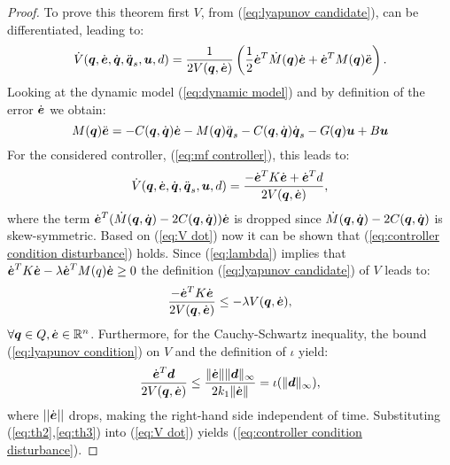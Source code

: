 \begin{proof}
    To prove this theorem first $V$, from (\ref{eq:lyapunov candidate}), can be differentiated, leading to:
    \begin{equation}
        \dot{V}({\boldsymbol{q}},\dot{\boldsymbol{e}},\dot{{\boldsymbol{q}}},\ddot{{\boldsymbol{q}}}_s,\boldsymbol{u},d) = \frac{1}{2 V({\boldsymbol{q}},\dot{\boldsymbol{e}})} \left( \frac{1}{2}\dot{\boldsymbol{e}}^T \dot{M}({\boldsymbol{q}}) \dot{\boldsymbol{e}}+\dot{\boldsymbol{e}}^T M({\boldsymbol{q}}) \ddot{\boldsymbol{e}} \right).
    \end{equation}
    Looking at the dynamic model (\ref{eq:dynamic model}) and by definition of the error $\dot{\boldsymbol{e}}$ we obtain:
    \begin{equation}
        M({\boldsymbol{q}})\ddot{\boldsymbol{e}}=-C({\boldsymbol{q}},\dot{{\boldsymbol{q}}})\dot{\boldsymbol{e}}-M({\boldsymbol{q}})\ddot{{\boldsymbol{q}}}_s-C({\boldsymbol{q}},\dot{{\boldsymbol{q}}})\dot{{\boldsymbol{q}}}_s-G({\boldsymbol{q}})\boldsymbol{u}+B\boldsymbol{u}     
    \end{equation}
    For the considered controller, (\ref{eq:mf controller}), this leads to:
    \begin{equation} \label{eq:V dot}
        \dot{V}({\boldsymbol{q}},\dot{\boldsymbol{e}},\dot{{\boldsymbol{q}}},\ddot{{\boldsymbol{q}}}_s,\boldsymbol{u},d) = \frac{-\dot{\boldsymbol{e}}^T K \dot{\boldsymbol{e}} + \dot{\boldsymbol{e}}^T d}{2 V({\boldsymbol{q}},\dot{\boldsymbol{e}})},
    \end{equation}
    where the term $\dot{\boldsymbol{e}}^T(\dot{M}({\boldsymbol{q}},\dot{{\boldsymbol{q}}})-2C({\boldsymbol{q}},\dot{{\boldsymbol{q}}}))\dot{\boldsymbol{e}}$ is dropped since $\dot{M}({\boldsymbol{q}},\dot{{\boldsymbol{q}}})-2C({\boldsymbol{q}},\dot{{\boldsymbol{q}}})$ is \\skew-symmetric. Based on (\ref{eq:V dot}) now it can be shown that (\ref{eq:controller condition disturbance}) holds. Since (\ref{eq:lambda}) implies that $\dot{\boldsymbol{e}}^T K\dot{\boldsymbol{e}}-\lambda \dot{\boldsymbol{e}}^T M(q) \dot{\boldsymbol{e}} \geq 0$ the definition (\ref{eq:lyapunov candidate}) of $V$ leads to:
    \begin{equation} \label{eq:th2}
        \frac{-\dot{\boldsymbol{e}}^T K\dot{\boldsymbol{e}}}{2V({\boldsymbol{q}},\dot{\boldsymbol{e}})}\leq -\lambda V({\boldsymbol{q}},\dot{\boldsymbol{e}}),  
    \end{equation}
    $\forall {\boldsymbol{q}} \in Q, \dot{\boldsymbol{e}} \in \mathbb{R}^n$. Furthermore, for the Cauchy-Schwartz inequality, the bound (\ref{eq:lyapunov condition}) on $V$ and the definition of $\iota$ yield:
    \begin{equation} \label{eq:th3}
        \frac{\dot{\boldsymbol{e}}^T\boldsymbol{d}}{2V({\boldsymbol{q}},\dot{\boldsymbol{e}})}\leq \frac{\lVert \dot{\boldsymbol{e}}\rVert \lVert \boldsymbol{d} \rVert _\infty}{2k_1\lVert \dot{\boldsymbol{e}} \rVert}=\iota(\lVert \boldsymbol{d} \rVert _\infty),
    \end{equation}
    where $||\dot{\boldsymbol{e}}||$ drops, making the right-hand side independent of time. Substituting (\ref{eq:th2},\ref{eq:th3}) into (\ref{eq:V dot}) yields (\ref{eq:controller condition disturbance}).
\end{proof}